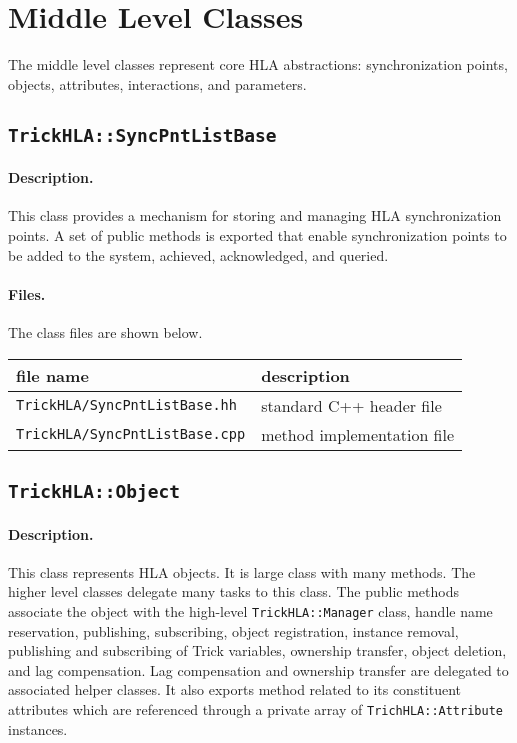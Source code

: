 \section{Middle Level Classes}

The middle level classes represent core HLA abstractions:
synchronization points,
objects, attributes, interactions, and parameters.

\subsection{{\tt TrickHLA::SyncPntListBase}}

\paragraph{Description.}
This class provides a mechanism for storing and managing HLA
synchronization points.
A set of public methods is exported that enable synchronization points
to be added to the system, achieved, acknowledged, and queried.

\paragraph{Files.}
The class files are shown below.
   
{
  \scriptsize
  \begin{tabular}{|l|l|} 
    \hline
    file name & description \\
    \hline \hline
    {\tt TrickHLA/SyncPntListBase.hh} 
    & standard C++ header file
    \\ \hline
    {\tt TrickHLA/SyncPntListBase.cpp} 
    & method implementation file
    \\ \hline
  \end{tabular}
}

\subsection{{\tt TrickHLA::Object}}

\paragraph{Description.}
This class represents HLA objects.
It is large class with many methods.  
The higher level classes delegate many tasks to this class.
The public methods associate the object with the high-level
{\tt TrickHLA::Manager} class, handle name reservation, publishing,
subscribing, object registration, instance removal,
publishing and subscribing of Trick variables,
ownership transfer, object deletion, and lag compensation.
Lag compensation and ownership transfer are delegated to associated
helper classes.
It also exports method related to its constituent attributes which are
referenced through a private array of {\tt TrichHLA::Attribute} instances.

